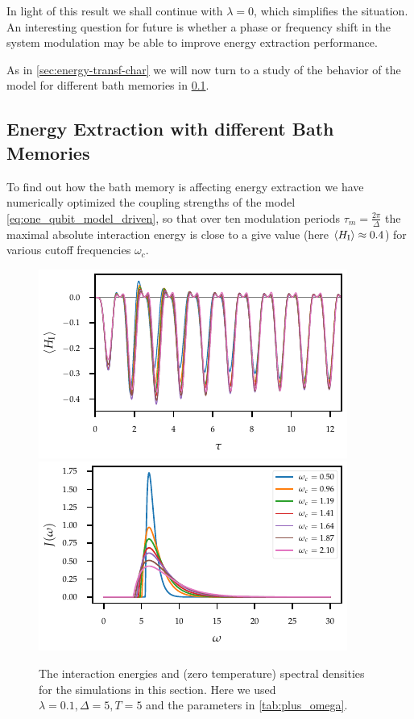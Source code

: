 In light of this result we shall continue with \(λ=0\), which
simplifies the situation. An interesting question for future is
whether a phase or frequency shift in the system modulation may be
able to improve energy extraction performance.

As in \cref{sec:energy-transf-char} we will now turn to a study of the
behavior of the model for different bath memories in
\cref{sec:extr_mem}.

\subsection{Energy Extraction with different Bath Memories}
\label{sec:extr_mem}
To find out how the bath memory is affecting energy extraction we have
numerically optimized the coupling strengths of the model
\cref{eq:one_qubit_model_driven}, so that over ten modulation periods
\(τ_{m} = \frac{2 π}{Δ}\) the maximal absolute interaction energy is
close to a give value (here \(\ev{H_{\inter}}\approx 0.4\)) for
various cutoff frequencies \(ω_{c}\).
\begin{figure}[htp]
  \centering
  \includegraphics{figs/one_bath_mod/omega_interactions}
  \includegraphics{figs/one_bath_mod/omega_sd}
  \caption{\label{fig:omega_couplings_and_energies} The interaction
    energies and (zero temperature) spectral densities for the
    simulations in this section. Here we used \(λ=0.1, Δ=5, T=5\) and
    the parameters in \cref{tab:plus_omega}.}
\end{figure}

